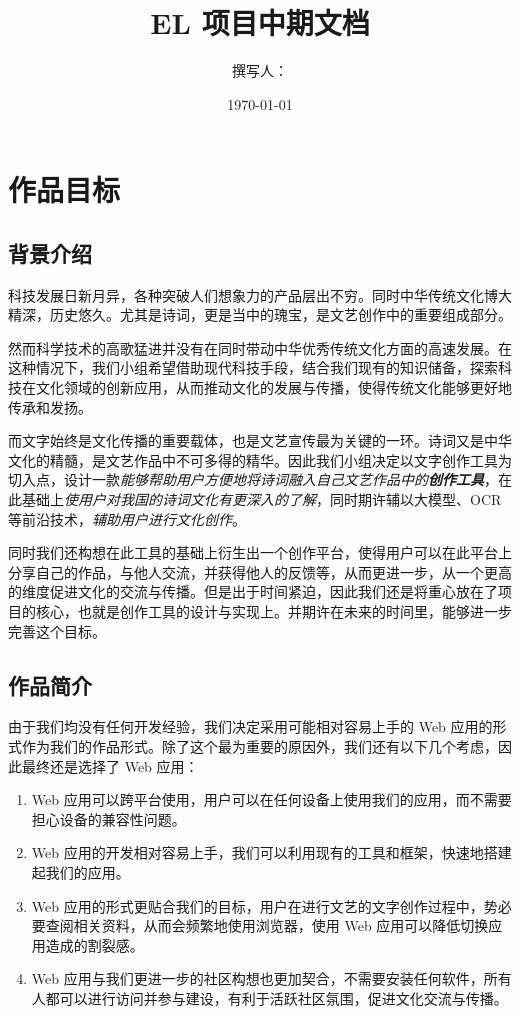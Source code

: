 \documentclass[
    UTF8,
    12pt,
    oneside,
    a4paper
]{ctexart}
\title{EL 项目中期文档}
\date{\today}
\author{撰写人：\wo}
\begin{document}
\maketitle

\section{作品目标}

\subsection{背景介绍}

科技发展日新月异，各种突破人们想象力的产品层出不穷。同时中华传统文化博大精深，历史悠久。尤其是诗词，更是当中的瑰宝，是文艺创作中的重要组成部分。

然而科学技术的高歌猛进并没有在同时带动中华优秀传统文化方面的高速发展。在这种情况下，我们小组希望借助现代科技手段，结合我们现有的知识储备，探索科技在文化领域的创新应用，从而推动文化的发展与传播，使得传统文化能够更好地传承和发扬。

而文字始终是文化传播的重要载体，也是文艺宣传最为关键的一环。诗词又是中华文化的精髓，是文艺作品中不可多得的精华。因此我们小组决定以文字创作工具为切入点，设计一款\emph{能够帮助用户方便地将诗词融入自己文艺作品中的\textbf{创作工具}}，在此基础上\emph{使用户对我国的诗词文化有更深入的了解}，同时期许辅以大模型、OCR 等前沿技术，\emph{辅助用户进行文化创作}。

同时我们还构想在此工具的基础上衍生出一个创作平台，使得用户可以在此平台上分享自己的作品，与他人交流，并获得他人的反馈等，从而更进一步，从一个更高的维度促进文化的交流与传播。但是出于时间紧迫，因此我们还是将重心放在了项目的核心，也就是创作工具的设计与实现上。并期许在未来的时间里，能够进一步完善这个目标。

\subsection{作品简介}

由于我们均没有任何开发经验，我们决定采用可能相对容易上手的 Web 应用的形式作为我们的作品形式。除了这个最为重要的原因外，我们还有以下几个考虑，因此最终还是选择了 Web 应用：

\begin{enumerate}
    \item Web 应用可以跨平台使用，用户可以在任何设备上使用我们的应用，而不需要担心设备的兼容性问题。
    \item Web 应用的开发相对容易上手，我们可以利用现有的工具和框架，快速地搭建起我们的应用。
    \item Web 应用的形式更贴合我们的目标，用户在进行文艺的文字创作过程中，势必要查阅相关资料，从而会频繁地使用浏览器，使用 Web 应用可以降低切换应用造成的割裂感。
    \item Web 应用与我们更进一步的社区构想也更加契合，不需要安装任何软件，所有人都可以进行访问并参与建设，有利于活跃社区氛围，促进文化交流与传播。
\end{enumerate}
\end{document}

